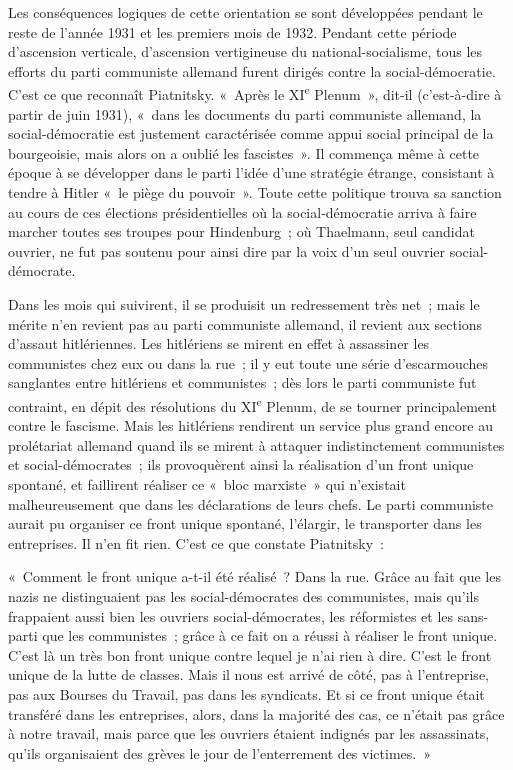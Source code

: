 \documentclass[french,twoside]{book} %
\begin{document}
Les conséquences logiques de cette orientation se sont développées pendant le reste de l'année 1931 et les premiers mois de 1932. Pendant cette période d'ascension verticale, d'ascension vertigineuse du national-socialisme, tous les efforts du parti communiste allemand furent dirigés contre la social-démocratie. C'est ce que reconnaît Piatnitsky. « Après le XI\textsuperscript{e} Plenum », dit-il (c'est-à-dire à partir de juin 1931), « dans les documents du parti communiste allemand, la social-démocratie est justement caractérisée comme appui social principal de la bourgeoisie, mais alors on a oublié les fascistes ». Il commença même à cette époque à se développer dans le parti l'idée d'une stratégie étran­ge, consistant à tendre à Hitler « le piège du pouvoir ». Toute cette politique trouva sa sanction au cours de ces élections présidentielles où la social-démocratie arriva à faire marcher toutes ses troupes pour Hindenburg ; où Thaelmann, seul candidat ouvrier, ne fut pas soutenu pour ainsi dire par la voix d'un seul ouvrier social-démocrate.\par
Dans les mois qui suivirent, il se produisit un redressement très net ; mais le mérite n'en revient pas au parti communiste allemand, il revient aux sections d'assaut hitlériennes. Les hitlériens se mirent en effet à assassiner les communistes chez eux ou dans la rue ; il y eut toute une série d'escarmouches sanglantes entre hitlériens et communistes ; dès lors le parti communiste fut contraint, en dépit des résolutions du XI\textsuperscript{e} Plenum, de se tourner principalement contre le fascisme. Mais les hitlériens rendirent un service plus grand encore au prolétariat allemand quand ils se mirent à attaquer indistinctement communistes et social-démocrates ; ils provoquèrent ainsi la réalisation d'un front unique spontané, et faillirent réaliser ce « bloc marxiste » qui n'existait malheureusement que dans les déclarations de leurs chefs. Le parti commu­niste aurait pu organiser ce front unique spontané, l'élargir, le transporter dans les entreprises. Il n'en fit rien. C'est ce que constate Piatnitsky :\par
« Comment le front unique a-t-il été réalisé ? Dans la rue. Grâce au fait que les nazis ne distinguaient pas les social-démocrates des communistes, mais qu'ils frappaient aussi bien les ouvriers social-démocrates, les réfor­mistes et les sans-parti que les communistes ; grâce à ce fait on a réussi à réaliser le front unique. C'est là un très bon front unique contre lequel je n'ai rien à dire. C'est le front unique de la lutte de classes. Mais il nous est arrivé de côté, pas à l'entreprise, pas aux Bourses du Travail, pas dans les syndicats. Et si ce front unique était transféré dans les entreprises, alors, dans la majorité des cas, ce n'était pas grâce à notre travail, mais parce que les ouvriers étaient indignés par les assassinats, qu'ils organisaient des grèves le jour de l'enterrement des victimes. »\par
\end{document}
